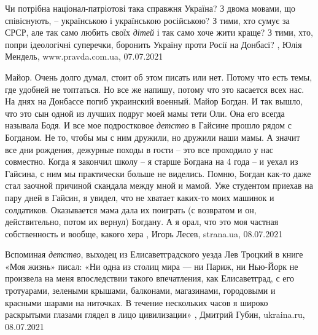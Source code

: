 Чи потрібна націонал-патріотові така справжня Україна? З двома мовами, що
співіснують, – українською і українською російською? З тими, хто сумує за СРСР,
але так само любить своїх \emph{дітей} і так само хоче жити краще?  З тими,
хто, попри ідеологічні суперечки, боронить Україну проти Росії на Донбасі?
, 
Юлія Мендель, www.pravda.com.ua, 07.07.2021

Майор.
Очень долго думал, стоит об этом писать или нет. Потому что есть темы, где
удобней не топтаться. Но все же напишу, потому что это касается всех нас.
На днях на Донбассе погиб украинский военный. Майор Богдан. И так вышло, что
это сын одной из лучших подруг моей мамы тети Оли. Она его всегда называла
Бодя. И все мое подростковое \emph{детство} в Гайсине прошло рядом с Богданом. Не то,
чтобы мы с ним дружили, но дружили наши мамы. А значит все дни рождения,
дежурные походы в гости – это все проходило у нас совместно.
Когда я закончил школу – я старше Богдана на 4 года – и уехал из Гайсина, с ним
мы практически больше не виделись. Помню, Богдан как-то даже стал заочной
причиной скандала между мной и мамой. Уже студентом приехав на пару дней в
Гайсин, я увидел, что не хватает каких-то моих машинок и солдатиков.
Оказывается мама дала их поиграть (с возвратом и он, действительно, потом их
вернул) Богдану. А я орал, что это моя частная собственность и вообще, какого
хера
, 
Игорь Лесев, strana.ua, 08.07.2021

Вспоминая \emph{детство}, выходец из Елисаветградского уезда Лев Троцкий в
книге «Моя жизнь» писал: «Ни одна из столиц мира — ни Париж, ни Нью-Йорк не
произвела на меня впоследствии такого впечатления, как Елисаветград, с его
тротуарами, зелеными крышами, балконами, магазинами, городовыми и красными
шарами на ниточках. В течение нескольких часов я широко раскрытыми глазами
глядел в лицо цивилизации»
, Дмитрий Губин, ukraina.ru, 08.07.2021


